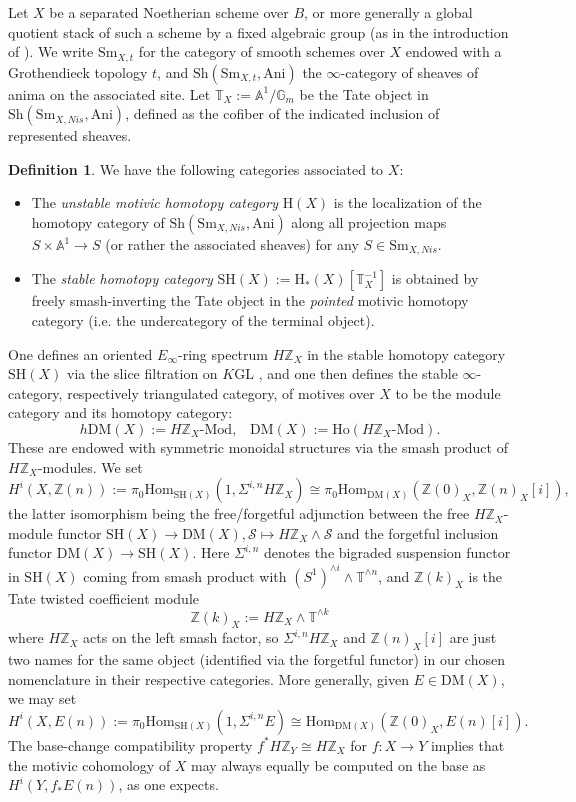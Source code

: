 \documentclass[a4paper,reqno,11pt]{amsart}
\theoremstyle{plain}
\theoremstyle{definition}
\newtheorem{definition}[theorem]{Definition}
\theoremstyle{remark}
\newcommand{\Sh}{{\mathrm{Sh}}}
\newcommand{\Sm}{{\mathrm{Sm}}}
\renewcommand{\H}{{\mathrm{H}}}
\newcommand{\Z}{\mathbb{Z}}
\newcommand{\A}{\mathbb{A}}
\newcommand{\G}{\mathbb{G}}
\newcommand{\T}{\mathbb{T}}
\newcommand{\DM}{\mathrm{DM}}
\newcommand{\SH}{\mathrm{SH}}
\newcommand{\GL}{\mathrm{GL}}
\newcommand{\Hom}{\mathrm{Hom}}
\begin{document}
Let $X$ be a separated Noetherian scheme over $B$, or more generally a global quotient stack of such a scheme by a fixed algebraic group (as in the introduction of \cite{Hoy}). We write $\Sm_{X,t}$ for the category of smooth schemes over $X$ endowed with a Grothendieck topology $t$, and $\Sh(\Sm_{X,t}, \mathrm{Ani})$ the $\infty$-category of sheaves of anima on the associated site. Let $\T_X := \A^1 / \G_m$ be the Tate object in $\Sh(\Sm_{X,Nis}, \mathrm{Ani})$, defined as the cofiber of the indicated inclusion of represented sheaves.
\begin{definition}
We have the following categories associated to $X$:
\begin{itemize}
    \item The \emph{unstable motivic homotopy category} $\H(X)$ is the localization of the homotopy category of $\Sh(\Sm_{X,Nis}, \mathrm{Ani})$ along all projection maps $S\times \A^1 \to S$ (or rather the associated sheaves) for any $S\in \Sm_{X,Nis}$. 
    \item The \emph{stable homotopy category} $\SH(X):= \H_*(X)[\T_X^{-1}]$ is obtained by freely smash-inverting the Tate object in the \emph{pointed} motivic homotopy category (i.e. the undercategory of the terminal object).
\end{itemize}
\end{definition}
One defines an oriented $E_\infty$-ring spectrum $H\Z_X$ in the stable homotopy category $\SH(X)$ via the slice filtration on $K\GL$ \cite{BEM}, and one then defines the stable $\infty$-category, respectively triangulated category, of motives over $X$ to be the module category and its homotopy category:
\[
h\DM(X):= H\Z_X\text{-}\mathrm{Mod},\;\;\;\DM(X) := \mathrm{Ho}(H\Z_X\text{-}\mathrm{Mod}).
\]
These are endowed with symmetric monoidal structures via the smash product of $H\Z_X$-modules. We set
\[
    H^i(X,\Z(n)) := \pi_0\Hom_{\SH(X)}(1, \Sigma^{i,n} H\Z_X) \cong \pi_0\Hom_{\DM(X)}(\Z(0)_X,\Z(n)_X[i]),
\]
the latter isomorphism being the free/forgetful adjunction between the free $H\Z_X$-module functor $\SH(X) \to \DM(X), \mathcal{S}\mapsto H\Z_X \wedge \mathcal{S}$ and the forgetful inclusion functor $\DM(X) \to \SH(X)$. Here $\Sigma^{i,n}$ denotes the bigraded suspension functor in $\SH(X)$ coming from smash product with $(S^1)^{\wedge i} \wedge \T^{\wedge n}$, and $\Z(k)_X$ is the Tate twisted coefficient module
\[
    \Z(k)_X := H\Z_X \wedge \T^{\wedge k}
\]
where $H\Z_X$ acts on the left smash factor, so $\Sigma^{i,n} H\Z_X$ and $\Z(n)_X[i]$ are just two names for the same object (identified via the forgetful functor) in our chosen nomenclature in their respective categories. More generally, given $E\in \DM(X)$, we may set 
\[
H^i(X, E(n)) := \pi_0\Hom_{\SH(X)}(1, \Sigma^{i,n}E) \cong \Hom_{\DM(X)} (\Z(0)_X, E(n)[i]).
\]
The base-change compatibility property $f^* H\Z_Y \cong  H\Z_X$ for $f:X\to Y$ implies that the motivic cohomology of $X$ may always equally be computed on the base as $H^i(Y, f_*E(n))$, as one expects.
\end{document}

